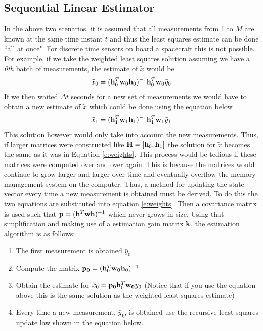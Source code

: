 \documentclass{article}
\begin{document}
\subsection{Sequential Linear Estimator}

In the above two scenarios, it is assumed that all measurements from 1
to $M$ are known at the same time instant $t$ and thus the least squares estimate can be done ``all
at once". For discrete time sensors on board a spacecraft this is
not possible. For example, if we take the weighted least squares
solution assuming we have a {\it 0th} batch of measurements, the
estimate of $\tilde{x}$ would be
\begin{equation}
  \tilde{x}_0 = ({\bf h}_0^T{\bf w}_0{\bf h}_0)^{-1}{\bf h}_0^T{\bf
    w}_0\bar{y}_0
\end{equation}
If we then waited $\Delta t$ seconds for a new set of measurements we
would have to obtain a new estimate of $\tilde{x}$ which could be done
using the equation below
\begin{equation}
  \tilde{x}_1 = ({\bf h}_1^T{\bf w}_1{\bf h}_1)^{-1}{\bf h}_1^T{\bf
    w}_1\bar{y}_1
\end{equation}
This solution however would only take into account the new
measurements. Thus, if larger matrices were constructed like
${\bf H} = [{\bf h}_0,{\bf h}_1]$ the solution for $\tilde{x}$ becomes
the same as it was in Equation \ref{e:weights}. This process would be
tedious if these matrices were computed over and over again. This is
because the matrices would continue to grow larger and larger over
time and eventually overflow the memory management system on the
computer. Thus, a method for updating the state vector every time
a new measurement is obtained must be derived. To do this the two
equations are substituted into equation \ref{e:weights}. Then a
covariance matrix is used such that ${\bf p} = ({\bf h}^T{\bf w}{\bf h})^{-1}$ 
which never grows in size. Using that simplification and making use of
a estimation gain matrix ${\bf k}$, the estimation algorithm is as follows:
\begin{enumerate}[itemsep=-5pt]
    \item The first measurement is obtained $\bar{y}_0$
    \item Compute the matrix ${\bf p_0} = ({\bf h}_0^T{\bf w_0}{\bf h}_0)^{-1}$
    \item Obtain the estimate for $\tilde{x}_0 = {\bf p_0}{\bf
      h}_0^T{\bf w_0}\bar{y}_0$ (Notice that if you use the equation
      above this is the same solution as the weighted least squares estimate)
    \item Every time a new measurement, $\bar{y}_k$, is obtained use the recursive least squares update law shown in the equation below.  
\end{enumerate}
\end{document}
